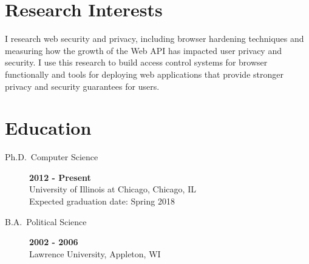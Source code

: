 \documentclass{vitae}
\author{Peter Snyder}
\begin{document}
  \maketitle

  \section{Research Interests}
  \begin{description}
  \item{\noindent I research web security and privacy, including browser hardening techniques and
  measuring how the growth of the Web API has impacted user privacy and security.
  I use this research to build access control systems for browser functionally
  and tools for deploying web applications that provide stronger
  privacy and security guarantees for users.}
  \end{description}

  \section{Education}
  \begin{description}
    \item[Ph.D.~Computer Science] \hfill \textbf{2012 - Present}\\
    University of Illinois at Chicago, Chicago, IL\\
    Expected graduation date: Spring 2018

    \item[B.A.~Political Science] \hfill \textbf{2002 - 2006}~\\
    Lawrence University, Appleton, WI
  \end{description}

  
    \nocite{snyder2017browser}
    \nocite{snyder2017doxing}
    \nocite{snyder2017cdf}
    \nocite{snyder2016browser}
    \nocite{snyder2016characterizing}
    \nocite{snyder2016phishing}
    \nocite{snyder2015no}
    \nocite{clark2015saw}
    \nocite{snyder2014yao}
    \nocite{snyder2014cloudsweeper}
    \nocite{snyder2013cloudsweeper}
  
\end{document}
